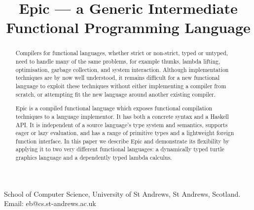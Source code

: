 \documentclass[preprint]{sigplanconf}
\newcounter{per}
\begin{document}
\title{Epic --- a Generic Intermediate Functional Programming Language}

{School of Computer Science, 
University of St Andrews, St Andrews, Scotland.}
{Email: eb@cs.st-andrews.ac.uk}


\maketitle

\begin{abstract}
Compilers for functional languages, whether strict or non-strict,
typed or untyped, need to handle many of the same problems, for
example thunks, lambda lifting, optimisation, garbage collection, and
system interaction.  Although implementation techniques are by now
well understood, it remains difficult for a new functional language to
exploit these techniques without either implementing a compiler from
scratch, or attempting fit the new language around another existing
compiler.

Epic is a compiled functional language which exposes functional
compilation techniques to a language implementor. It has both a
concrete syntax and a Haskell API. It is independent of a source
language's type system and semantics, supports eager or lazy
evaluation, and has a range of primitive types and a lightweight
foreign function interface. In this paper we describe Epic and
demonstrate its flexibility by applying it to two very different
functional languages: a dynamically typed turtle graphics language and
a dependently typed lambda calculus.

\end{abstract}














\begin{small}


\appendix

%

\end{small}
\end{document}

